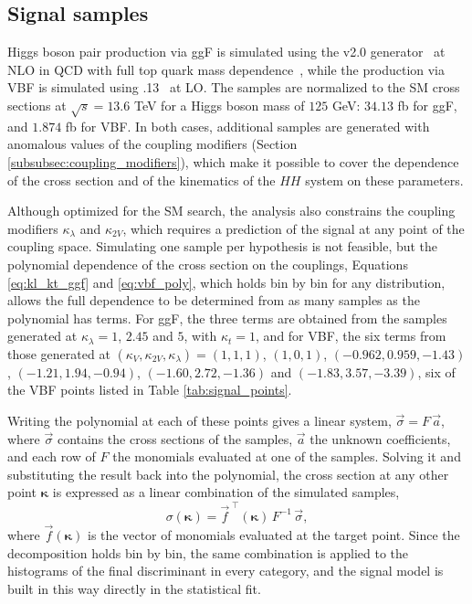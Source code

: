 \subsection{Signal samples}
%
Higgs boson pair production via ggF is simulated using the \POWHEG v2.0 generator~\cite{powheg1,powheg2,powheg3} at NLO in QCD with full top quark mass dependence~\cite{Heinrich:2017kxx,Heinrich:2019bkc}, while the production via VBF is simulated using .13~\cite{Alwall:2014hca} at LO. The samples are normalized to the SM cross sections at $\sqrt{s} = 13.6$ TeV for a Higgs boson mass of $125$ GeV: $34.13$ fb for ggF, and $1.874$ fb for VBF. In both cases, additional samples are generated with anomalous values of the coupling modifiers (Section \ref{subsubsec:coupling_modifiers}), which make it possible to cover the dependence of the cross section and of the kinematics of the $HH$ system on these parameters.

Although optimized for the SM search, the analysis also constrains the coupling modifiers $\kappa_\lambda$ and $\kappa_{2V}$, which requires a prediction of the signal at any point of the coupling space. Simulating one sample per hypothesis is not feasible, but the polynomial dependence of the cross section on the couplings, Equations \ref{eq:kl_kt_ggf} and \ref{eq:vbf_poly}, which holds bin by bin for any distribution, allows the full dependence to be determined from as many samples as the polynomial has terms. For ggF, the three terms are obtained from the samples generated at $\kappa_\lambda = 1$, $2.45$ and $5$, with $\kappa_t = 1$, and for VBF, the six terms from those generated at $(\kappa_V, \kappa_{2V}, \kappa_\lambda) = (1, 1, 1)$, $(1, 0, 1)$, $(-0.962, 0.959, -1.43)$, $(-1.21, 1.94, -0.94)$, $(-1.60, 2.72, -1.36)$ and $(-1.83, 3.57, -3.39)$, six of the VBF points listed in Table \ref{tab:signal_points}.

Writing the polynomial at each of these points gives a linear system, $\vec{\sigma} = F\,\vec{a}$, where $\vec{\sigma}$ contains the cross sections of the samples, $\vec{a}$ the unknown coefficients, and each row of $F$ the monomials evaluated at one of the samples. Solving it and substituting the result back into the polynomial, the cross section at any other point $\boldsymbol{\kappa}$ is expressed as a linear combination of the simulated samples,
%
\begin{equation}
    \sigma(\boldsymbol{\kappa}) = \vec{f}^{\;\top}(\boldsymbol{\kappa})\, F^{-1}\,\vec{\sigma},
    \label{eq:matrix_inversion}
\end{equation}
%
where $\vec{f}(\boldsymbol{\kappa})$ is the vector of monomials evaluated at the target point. Since the decomposition holds bin by bin, the same combination is applied to the histograms of the final discriminant in every category, and the signal model is built in this way directly in the statistical fit.\medskip


